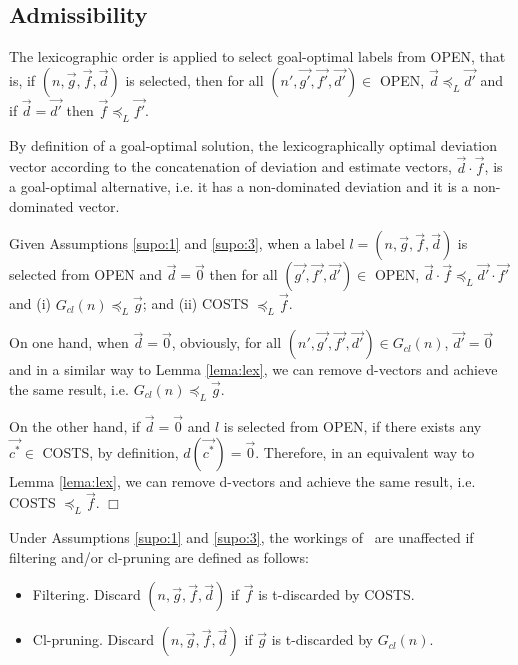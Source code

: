 \subsection{Admissibility}
\label{chapFormalAnalysis:sec:admissibilityLexgote}

\begin{supo} \label{supo:3}
The lexicographic order is applied to select goal-optimal labels
from OPEN, that is, if $(n,\vec g,\vec f,\vec d)$ is selected, then for all $(n',\vec{g'},\vec{f'},\vec{d'})\in$ OPEN,
$\vec d \preceq_L \vec{d'}$ and if $\vec d = \vec{d'}$ then $\vec f \preceq_L \vec{f'}$. 
\end{supo}
 
By definition of a goal-optimal solution, the lexicographically optimal deviation vector according to the concatenation of deviation and estimate vectors, $\vec d \cdot \vec f$, is a goal-optimal alternative, i.e. it has a non-dominated deviation and it is a non-dominated vector.

\begin{lema}\label{lema:lexgote}
Given Assumptions \ref{supo:1} and \ref{supo:3}, when a label $l = (n,\vec g,\vec f,\vec d)$ is selected from OPEN and  $\vec d = \vec 0$ then for all $(\vec{g'},\vec{f'},\vec{d'})\in$ OPEN, $\vec d \cdot \vec f \preceq_L \vec{d'} \cdot \vec{f'}$ and (i) $G_{cl}(n) \preceq_L \vec g$; and (ii) COSTS $\preceq_L \vec f$.
\end{lema}

\begin{demo}
On one hand, when $\vec d = \vec 0$, obviously, for all $(n',\vec{g'},\vec{f'},\vec{d'})\in G_{cl}(n)$, $ \vec{d'} = \vec 0$ and in a similar way to Lemma \ref{lema:lex}, we can remove d-vectors and achieve the same result, i.e.  $G_{cl}(n) \preceq_L \vec g$.

On the other hand, if $ \vec d = \vec 0$ and $l$ is selected from OPEN, if there exists any $\vec{c^*} \in$ COSTS, by definition, $d(\vec{c^*}) = \vec 0$. Therefore, in an equivalent way to Lemma \ref{lema:lex}, we can remove d-vectors and achieve the same result, i.e. COSTS $\preceq_L \vec f$. $\Box$
\end{demo}

\begin{teorema}\label{teo:teo-lexgote}
Under Assumptions \ref{supo:1} and \ref{supo:3}, the workings of \lexgote \ are unaffected if filtering and/or cl-pruning are defined as follows:

\begin{itemize}
    \item Filtering. Discard $(n, \vec g, \vec f, \vec d)$ if $\vec f$ is t-discarded by COSTS.
	 \item Cl-pruning. Discard $(n, \vec g, \vec f, \vec d)$ if $\vec g$ is t-discarded by $G_{cl}(n)$.
\end{itemize}

\end{teorema}

